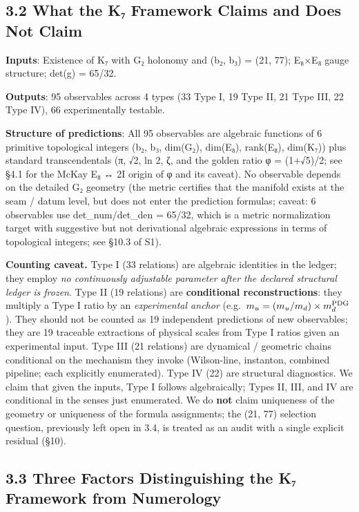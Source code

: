 \documentclass[11pt,a4paper]{article}
\begin{document}
\subsection{3.2 What the K₇ Framework Claims and Does Not Claim}\label{what-the-kux2087-framework-claims-and-does-not-claim}

\textbf{Inputs}: Existence of K₇ with G₂ holonomy and (b₂, b₃) = (21, 77); E₈×E₈ gauge structure; det(g) = 65/32.

\textbf{Outputs}: 95 observables across 4 types (33 Type I, 19 Type II, 21 Type III, 22 Type IV), 66 experimentally testable.

\textbf{Structure of predictions}: All 95 observables are algebraic functions of 6 primitive topological integers (b₂, b₃, dim(G₂), dim(E₈), rank(E₈), dim(K₇)) plus standard transcendentals (π, √2, ln 2, ζ, and the golden ratio φ = (1+√5)/2; see §4.1 for the McKay E₈ ↔ 2I origin of φ and its caveat). No observable depends on the detailed G₂ geometry (the metric certifies that the manifold exists at the seam / datum level, but does not enter the prediction formulas; caveat: 6 observables use det\_\allowbreak{}num/det\_\allowbreak{}den = 65/32, which is a metric normalization target with suggestive but not derivational algebraic expressions in terms of topological integers; see §10.3 of S1).

\textbf{Counting caveat.} Type I (33 relations) are algebraic identities in the ledger; they employ \emph{no continuously adjustable parameter after the declared structural ledger is frozen}. Type II (19 relations) are \textbf{conditional reconstructions}: they multiply a Type I ratio by an \emph{experimental anchor} (e.g.~\(m_u = (m_u/m_d) \times m_d^{\rm PDG}\)). They should not be counted as 19 independent predictions of new observables; they are 19 traceable extractions of physical scales from Type I ratios given an experimental input. Type III (21 relations) are dynamical / geometric chains conditional on the mechanism they invoke (Wilson-line, instanton, combined pipeline; each explicitly enumerated). Type IV (22) are structural diagnostics. We claim that given the inputs, Type I follows algebraically; Types II, III, and IV are conditional in the senses just enumerated. We do \textbf{not} claim uniqueness of the geometry or uniqueness of the formula assignments; the (21, 77) selection question, previously left open in 3.4, is treated as an audit with a single explicit residual (§10).

\subsection{3.3 Three Factors Distinguishing the K₇ Framework from Numerology}\label{three-factors-distinguishing-the-kux2087-framework-from-numerology}
\end{document}
